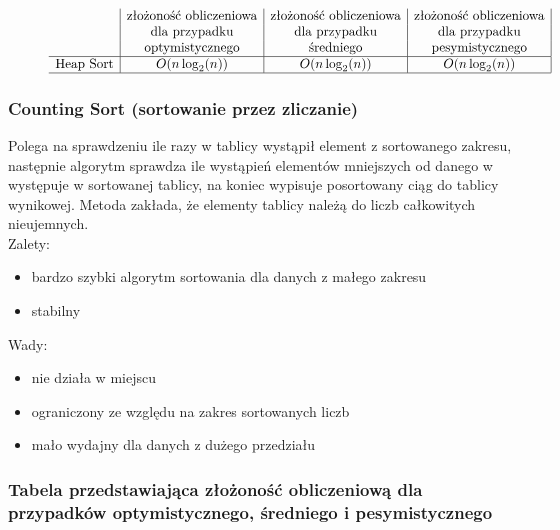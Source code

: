 \documentclass[polish,polish,a4paper]{article}
\begin{document}
\begin{spacing}{1.5}
\begin{figure}[H]
	\begin{equation*}
	\begin{array}{l|c|c|c|}

	&$złożoność obliczeniowa$&$złożoność obliczeniowa$&$złożoność obliczeniowa$\\
	&$dla przypadku$&$dla przypadku$&$dla przypadku$\\
	&$optymistycznego$&$średniego$&$pesymistycznego$\\
	\hline
	$Heap Sort$&O(n\log_{2}(n))&O(n\log_{2}(n))&O(n\log_{2}(n))\\
	\hline
	\end{array}
	\end{equation*}
\end{figure}

			\subsubsection*{Counting Sort (sortowanie przez zliczanie)}
			
			Polega na sprawdzeniu ile razy w tablicy wystąpił element z sortowanego zakresu, następnie algorytm sprawdza ile wystąpień elementów mniejszych od danego w występuje w sortowanej tablicy, na koniec wypisuje posortowany ciąg do tablicy wynikowej. Metoda zakłada, że elementy tablicy należą do liczb całkowitych nieujemnych.\\
			
Zalety:
\begin{itemize}
	\item bardzo szybki algorytm sortowania dla danych z małego zakresu
	\item stabilny
\end{itemize}
Wady:
\begin{itemize}
	\item nie działa w miejscu
	\item ograniczony ze względu na zakres sortowanych liczb
	\item mało wydajny dla danych z dużego przedziału
\end{itemize}


\subsubsection*{Tabela przedstawiająca złożoność obliczeniową dla przypadków optymistycznego, średniego i pesymistycznego} 
\begin{figure}[H]
	

\end{figure}
\end{spacing}
\end{document}
